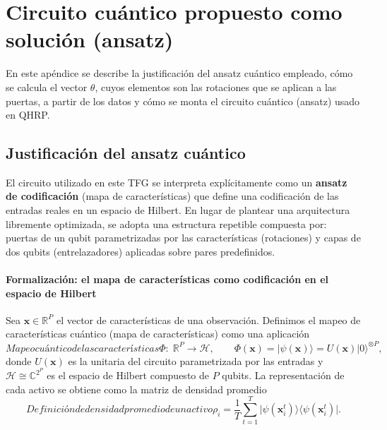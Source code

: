 \chapter{Circuito cuántico propuesto como solución (ansatz)}
\label{ap:estimacion_ansatz}

En este apéndice se describe la justificación del ansatz cuántico empleado, cómo se calcula el vector $\theta$, cuyos elementos son las rotaciones que se aplican a las puertas, a partir de los datos y cómo se monta el circuito cuántico (ansatz) usado en QHRP.

\section{Justificación del ansatz cuántico}
\label{sec:justificacion_ansatz}

El circuito utilizado en este TFG se interpreta explícitamente como un \textbf{ansatz de codificación} (mapa de características) que define una codificación de las entradas reales en un espacio de Hilbert. En lugar de plantear una arquitectura libremente optimizada, se adopta una estructura repetible compuesta por: puertas de un qubit parametrizadas por las características (rotaciones) y capas de dos qubits (entrelazadores) aplicadas sobre pares predefinidos.

\subsubsection{Formalización: el mapa de características como codificación en el espacio de Hilbert}

Sea $\mathbf{x}\in\mathbb{R}^P$ el vector de características de una observación. Definimos el mapeo de características cuántico (mapa de características) como una aplicación
\begin{equation}[eq:feature_map_cuantico]{Mapeo cuántico de las características}
\Phi:\;\mathbb{R}^P \longrightarrow \mathcal{H},
\qquad
\Phi(\mathbf{x}) = \lvert\psi(\mathbf{x})\rangle = U(\mathbf{x})\lvert 0\rangle^{\otimes P},
\end{equation}
donde $U(\mathbf{x})$ es la unitaria del circuito parametrizada por las entradas y $\mathcal{H}\cong\mathbb{C}^{2^P}$ es el espacio de Hilbert compuesto de $P$ qubits. La representación de cada activo se obtiene como la matriz de densidad promedio
\begin{equation}[eq:densidad_promedio_activo]{Definición de densidad promedio de un activo}
\rho_i = \frac{1}{T}\sum_{t=1}^T \lvert\psi(\mathbf{x}_i^t)\rangle\langle\psi(\mathbf{x}_i^t)\rvert.
\end{equation}

